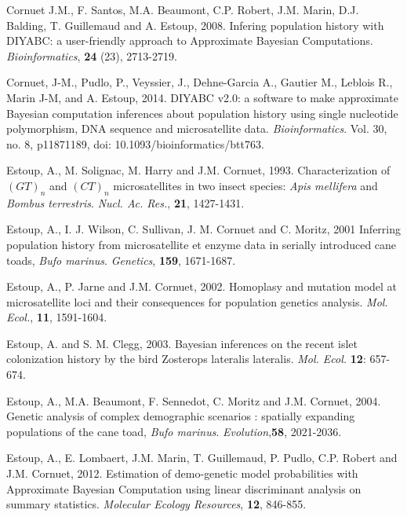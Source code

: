 \begin{thebibliography}{a}
Cornuet J.M., F. Santos,
M.A. Beaumont, C.P. Robert, J.M. Marin, D.J. Balding, T. Guillemaud
and A. Estoup, 2008. Infering population history with DIYABC: a user-friendly
approach to Approximate Bayesian Computations. \emph{Bioinformatics},
\textbf{24} (23), 2713-2719.

Cornuet, J-M., Pudlo, P., Veyssier, J., Dehne-Garcia
A., Gautier M., Leblois R., Marin J-M, and A. Estoup, 2014. DIYABC
v2.0: a software to make approximate Bayesian computation inferences
about population history using single nucleotide polymorphism, DNA
sequence and microsatellite data. \emph{Bioinformatics}. Vol. 30,
no. 8, p1187\textendash{}1189, doi: 10.1093/bioinformatics/btt763.

 Estoup, A., M. Solignac,
M. Harry and J.M. Cornuet, 1993. Characterization of $(GT)_{n}$ and
$(CT)_{n}$ microsatellites in two insect species: \emph{Apis mellifera}
and \emph{Bombus terrestris}. \emph{Nucl. Ac. Res.}, \textbf{21},
1427-1431.

 Estoup, A., I. J. Wilson,
C. Sullivan, J. M. Cornuet and C. Moritz, 2001 Inferring population
history from microsatellite et enzyme data in serially introduced
cane toads, \emph{Bufo marinus}. \emph{Genetics}, \textbf{159}, 1671-1687.

Estoup, A., P. Jarne and
J.M. Cornuet, 2002. Homoplasy and mutation model at microsatellite
loci and their consequences for population genetics analysis. \emph{Mol.
Ecol.}, \textbf{11}, 1591-1604.

 Estoup, A. and S. M. Clegg,
2003. Bayesian inferences on the recent islet colonization history
by the bird Zosterops lateralis lateralis. \emph{Mol. Ecol.} \textbf{12}:
657-674.

Estoup, A., M.A. Beaumont,
F. Sennedot, C. Moritz and J.M. Cornuet, 2004. Genetic analysis of
complex demographic scenarios : spatially expanding populations of
the cane toad, \emph{Bufo marinus}. \emph{Evolution},\textbf{58},
2021-2036.

Estoup, A., E. Lombaert,
J.M. Marin, T. Guillemaud, P. Pudlo, C.P. Robert and J.M. Cornuet,
2012. Estimation of demo-genetic model probabilities with Approximate
Bayesian Computation using linear discriminant analysis on summary
statistics. \emph{Molecular Ecology Resources}, \textbf{12}, 846-855.


\end{thebibliography}
